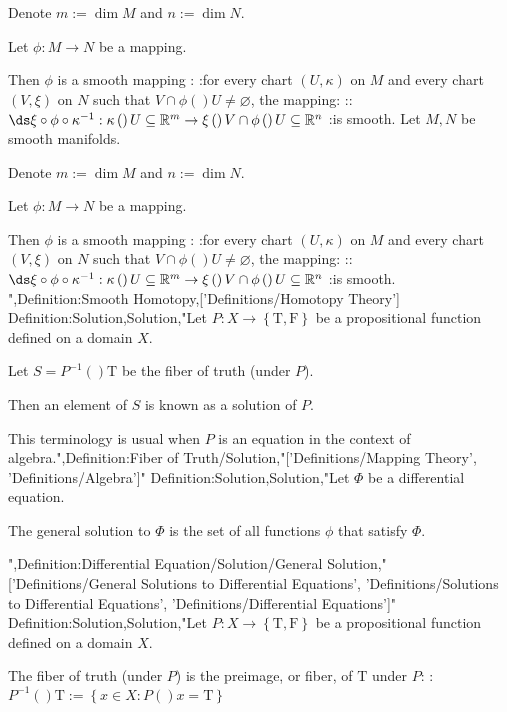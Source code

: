 Denote $m := \dim M$ and $n := \dim N$. 

Let $\phi: M \to N$ be a mapping. 


Then $\phi$ is a smooth mapping :
:for every chart $\left( U, \kappa \right)$ on $M$ and every chart $\left( V, \xi \right)$ on $N$ such that $V \cap \phi \left(   \right)U \ne \varnothing$, the mapping:
::$\ds \xi \circ \phi \circ \kappa^{-1}: \kappa \left(   \right)U \subseteq \mathbb R^m \to \xi \left(   \right){V \cap \phi \left(   \right)U} \subseteq \mathbb R^n$
:is smooth.
Let $M, N$ be smooth manifolds. 

Denote $m := \dim M$ and $n := \dim N$. 

Let $\phi: M \to N$ be a mapping. 


Then $\phi$ is a smooth mapping :
:for every chart $\left( U, \kappa \right)$ on $M$ and every chart $\left( V, \xi \right)$ on $N$ such that $V \cap \phi \left(   \right)U \ne \varnothing$, the mapping:
::$\ds \xi \circ \phi \circ \kappa^{-1}: \kappa \left(   \right)U \subseteq \mathbb R^m \to \xi \left(   \right){V \cap \phi \left(   \right)U} \subseteq \mathbb R^n$
:is smooth.
",Definition:Smooth Homotopy,['Definitions/Homotopy Theory']
Definition:Solution,Solution,"Let $P: X \to \left\lbrace \mathrm T, \mathrm F \right\rbrace$ be a propositional function defined on a domain $X$.

Let $S = P^{-1}  \left(   \right)\mathrm T$ be the fiber of truth (under $P$).


Then an element of $S$ is known as a solution of $P$.


This terminology is usual when $P$ is an equation in the context of algebra.",Definition:Fiber of Truth/Solution,"['Definitions/Mapping Theory', 'Definitions/Algebra']"
Definition:Solution,Solution,"Let $\Phi$ be a differential equation.

The general solution to $\Phi$ is the set of all functions $\phi$ that satisfy $\Phi$.



",Definition:Differential Equation/Solution/General Solution,"['Definitions/General Solutions to Differential Equations', 'Definitions/Solutions to Differential Equations', 'Definitions/Differential Equations']"
Definition:Solution,Solution,"Let $P: X \to \left\lbrace \mathrm T, \mathrm F \right\rbrace$ be a propositional function defined on a domain $X$.


The fiber of truth (under $P$) is the preimage, or fiber, of $\mathrm T$ under $P$:
:$P^{-1}  \left(   \right)\mathrm T := \left\lbrace x \in X: P \left(   \right)x = \mathrm T \right\rbrace$


